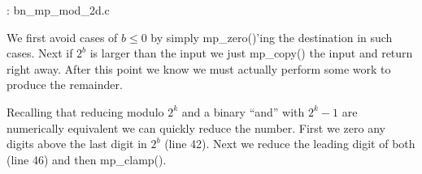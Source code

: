 \documentclass[b5paper]{book}
\begin{document}
\vspace{+3mm}\begin{small}
\hspace{-5.1mm}{\bf File}: bn\_mp\_mod\_2d.c
\vspace{-3mm}
\begin{alltt}
\end{alltt}
\end{small}

We first avoid cases of $b \le 0$ by simply mp\_zero()'ing the destination in such cases.  Next if $2^b$ is larger
than the input we just mp\_copy() the input and return right away.  After this point we know we must actually
perform some work to produce the remainder.

Recalling that reducing modulo $2^k$ and a binary ``and'' with $2^k - 1$ are numerically equivalent we can quickly reduce 
the number.  First we zero any digits above the last digit in $2^b$ (line 42).  Next we reduce the 
leading digit of both (line 46) and then mp\_clamp().
\end{document}
